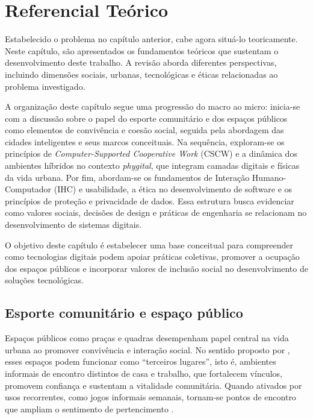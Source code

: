 \chapter[Referencial Teórico]{Referencial Teórico}

    Estabelecido o problema no capítulo anterior, cabe agora situá-lo teoricamente. Neste capítulo, são apresentados os fundamentos teóricos que sustentam o desenvolvimento deste trabalho. A revisão aborda diferentes perspectivas, incluindo dimensões sociais, urbanas, tecnológicas e éticas relacionadas ao problema investigado.

    A organização deste capítulo segue uma progressão do macro ao micro: inicia-se com a discussão sobre o papel do esporte comunitário e dos espaços públicos como elementos de convivência e coesão social, seguida pela abordagem das cidades inteligentes e seus marcos conceituais. Na sequência, exploram-se os princípios de \textit{Computer-Supported Cooperative Work} (CSCW) e a dinâmica dos ambientes híbridos no contexto \textit{phygital}, que integram camadas digitais e físicas da vida urbana. Por fim, abordam-se os fundamentos de Interação Humano-Computador (IHC) e usabilidade, a ética no desenvolvimento de software e os princípios de proteção e privacidade de dados. Essa estrutura busca evidenciar como valores sociais, decisões de design e práticas de engenharia se relacionam no desenvolvimento de sistemas digitais.

    O objetivo deste capítulo é estabelecer uma base conceitual para compreender como tecnologias digitais podem apoiar práticas coletivas, promover a ocupação dos espaços públicos e incorporar valores de inclusão social no desenvolvimento de soluções tecnológicas.

    \section{Esporte comunitário e espaço público}

        Espaços públicos como praças e quadras desempenham papel central na vida urbana ao promover convivência e interação social. No sentido proposto por , esses espaços podem funcionar como “terceiros lugares”, isto é, ambientes informais de encontro distintos de casa e trabalho, que fortalecem vínculos, promovem confiança e sustentam a vitalidade comunitária. Quando ativados por usos recorrentes, como jogos informais semanais, tornam-se pontos de encontro que ampliam o sentimento de pertencimento \cite{Oldenburg1999}.

